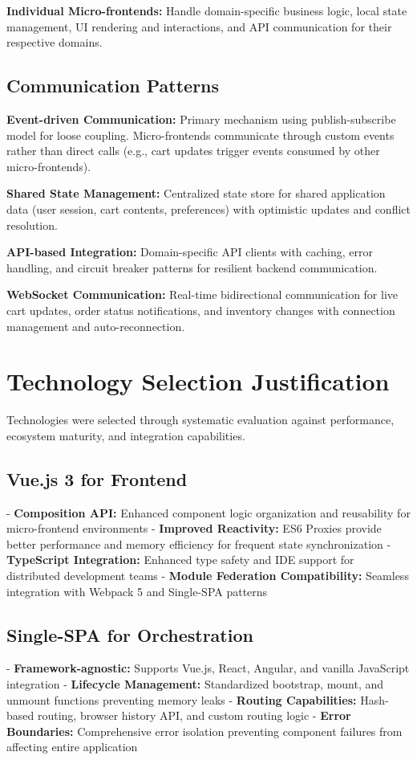 \documentclass[12pt,a4paper]{report}
\begin{document}
\textbf{Individual Micro-frontends:} Handle domain-specific business logic, local state management, UI rendering and interactions, and API communication for their respective domains.

\subsection{Communication Patterns}

\textbf{Event-driven Communication:} Primary mechanism using publish-subscribe model for loose coupling. Micro-frontends communicate through custom events rather than direct calls (e.g., cart updates trigger events consumed by other micro-frontends).

\textbf{Shared State Management:} Centralized state store for shared application data (user session, cart contents, preferences) with optimistic updates and conflict resolution.

\textbf{API-based Integration:} Domain-specific API clients with caching, error handling, and circuit breaker patterns for resilient backend communication.

\textbf{WebSocket Communication:} Real-time bidirectional communication for live cart updates, order status notifications, and inventory changes with connection management and auto-reconnection.

\section{Technology Selection Justification}

Technologies were selected through systematic evaluation against performance, ecosystem maturity, and integration capabilities.

\subsection{Vue.js 3 for Frontend}
- \textbf{Composition API:} Enhanced component logic organization and reusability for micro-frontend environments
- \textbf{Improved Reactivity:} ES6 Proxies provide better performance and memory efficiency for frequent state synchronization
- \textbf{TypeScript Integration:} Enhanced type safety and IDE support for distributed development teams
- \textbf{Module Federation Compatibility:} Seamless integration with Webpack 5 and Single-SPA patterns

\subsection{Single-SPA for Orchestration}
- \textbf{Framework-agnostic:} Supports Vue.js, React, Angular, and vanilla JavaScript integration
- \textbf{Lifecycle Management:} Standardized bootstrap, mount, and unmount functions preventing memory leaks
- \textbf{Routing Capabilities:} Hash-based routing, browser history API, and custom routing logic
- \textbf{Error Boundaries:} Comprehensive error isolation preventing component failures from affecting entire application
\end{document}
